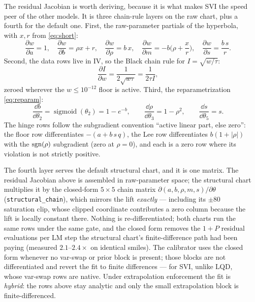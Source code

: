 \documentclass[11pt]{article}
\newcommand{\Iv}{I}                 %
\begin{document}
The residual Jacobian is worth deriving, because it is what makes SVI the speed
peer of the other models.  It is three chain-rule layers on the raw chart,
plus a fourth for the default one.  First, the
raw-parameter partials of the hyperbola, with $x,r$ from \eqref{eq:short}:
\begin{equation}
\frac{\partial w}{\partial a}=1,\quad
\frac{\partial w}{\partial b}=\rho x+r,\quad
\frac{\partial w}{\partial\rho}=b\,x,\quad
\frac{\partial w}{\partial m}=-b\Big(\rho+\frac{x}{r}\Big),\quad
\frac{\partial w}{\partial s}=\frac{b\,s}{r}.
\label{eq:partials}
\end{equation}
Second, the data rows live in IV, so the Black chain rule for $\Iv=\sqrt{w/\tau}$:
\begin{equation}
\frac{\partial\Iv}{\partial w}=\frac{1}{2\sqrt{w\tau}}=\frac{1}{2\tau\Iv},
\label{eq:ivchain}
\end{equation}
zeroed wherever the $w\le10^{-12}$ floor is active.  Third, the reparametrization
\eqref{eq:reparam}:
\begin{equation}
\frac{\dd b}{\dd\theta_2}=\operatorname{sigmoid}(\theta_2)=1-e^{-b},\qquad
\frac{\dd\rho}{\dd\theta_3}=1-\rho^2,\qquad
\frac{\dd s}{\dd\theta_5}=s.
\label{eq:reparamchain}
\end{equation}
The hinge rows follow the subgradient convention ``active linear part, else
zero'': the floor row differentiates $-(a+b\,s\,q)$, the Lee row differentiates
$b(1+|\rho|)$ with the $\operatorname{sgn}(\rho)$ subgradient (zero at $\rho=0$), and each is a
zero row where its violation is not strictly positive.

The fourth layer serves the default structural chart, and it is one matrix.
The residual Jacobian above is assembled in raw-parameter space; the
structural chart multiplies it by the closed-form $5\times5$ chain matrix
$\partial(a,b,\rho,m,s)/\partial\theta$ (\texttt{structural\_chain}), which
mirrors the lift \emph{exactly} --- including its $\pm80$ saturation clip,
whose clipped coordinate contributes a zero column because the lift is
locally constant there.  Nothing is re-differentiated; both charts run the
same rows under the same gate, and the closed form removes the $1+P$
residual evaluations per LM step the structural chart's finite-difference
path had been paying (measured $2.1$--$2.4\times$ on identical smiles).
The calibrator uses the
closed form whenever no var-swap or prior block is present; those blocks are
not
differentiated and revert the fit to finite differences --- for SVI, unlike
LQD, whose var-swap rows are native.
Under extrapolation enforcement the fit is \emph{hybrid}: the rows above stay
analytic and only the small extrapolation block is finite-differenced.
\end{document}
